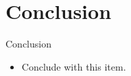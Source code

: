 \section{Conclusion}

\begin{frame}{Conclusion}
    \begin{itemize}
        \item Conclude with this item.
    \end{itemize}
\end{frame}